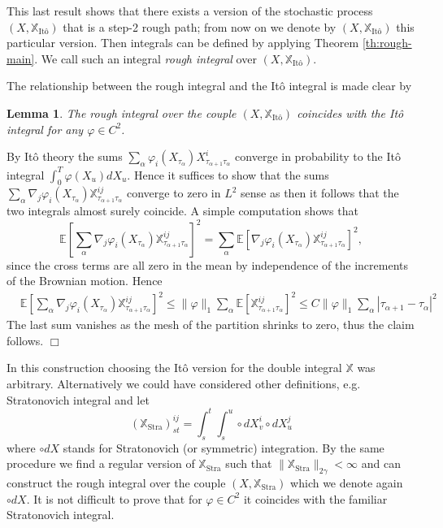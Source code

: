 \documentclass[a4paper,11pt]{article}
\newtheorem{lemma}[theorem]{Lemma}
\newenvironment{proof}[1][Proof]{{\sc #1.} }{\hfill $\Box$}
\newcommand{\expect}{\mathbb{E}}
\begin{document}
This last result shows that there exists a version of the stochastic process
$(X,\mathbb{X}_{\text{It\^o}})$ that is a step-2 rough path; from now on we 
denote by $(X,\mathbb{X}_{\text{It\^o}})$ this particular version. Then 
integrals can be defined by applying Theorem \ref{th:rough-main}. We
call such an integral \emph{rough integral} over $(X,\mathbb{X}_{\text{It\^o}})$.

The relationship between the rough integral and the It\^o integral is made
clear by 

\begin{lemma}
The rough integral over the couple $(X,\mathbb{X}_{\text{It\^o}})$
coincides with the It\^o integral for any $\varphi \in C^2$.  
\end{lemma}
\begin{proof}
By It\^o theory the sums
$
\sum_\alpha \varphi_i(X_{\tau_\alpha}) X^i_{\tau_{\alpha+1} \tau_\alpha}
$ 
converge in probability to the It\^o integral $\int_0^T \varphi(X_u) dX_u$.
Hence it suffices to show that the sums
$
\sum_\alpha \nabla_j \varphi_i(X_{\tau_\alpha}) \mathbb{X}_{\tau_{\alpha+1}
  \tau_\alpha}^{ij} 
$
converge to zero in $L^2$ sense as then it follows that the two
integrals almost surely coincide. A simple computation shows that
\begin{equation}
\expect\left[ \sum_\alpha \nabla_j \varphi_i(X_{\tau_\alpha}) 
\mathbb{X}_{\tau_{\alpha+1} \tau_\alpha}^{ij} \right]^2 
=  
\sum_\alpha \expect \left[  \nabla_j \varphi_i(X_{\tau_\alpha}) 
\mathbb{X}_{\tau_{\alpha+1} \tau_\alpha}^{ij} \right]^2,
\nonumber
\end{equation}
since the cross terms are all zero in the mean by independence of the
increments of the Brownian motion. Hence 
\begin{equation*}
  \begin{split}
& \expect\left[ \sum_\alpha \nabla_j \varphi_i(X_{\tau_\alpha}) 
  \mathbb{X}_{\tau_{\alpha+1} \tau_\alpha}^{ij} \right]^2
    \le \|\varphi\|_1 \sum_\alpha \expect \left[ \mathbb{X}_{\tau_{\alpha+1}
  \tau_\alpha}^{ij} \right]^2
    \le C \|\varphi\|_1 \sum_\alpha |\tau_{\alpha+1}
 - \tau_\alpha|^{2}
  \end{split}
\end{equation*}
The last sum vanishes as the mesh of the partition shrinks to zero, thus
the claim follows.
\end{proof}

In this construction choosing the It\^o version for the double integral
$\mathbb{X}$ was arbitrary. Alternatively we could have considered other
definitions, e.g. Stratonovich integral and let
$$
(\mathbb{X}_{\text{Stra}})_{st}^{ij} = \int_s^t \int_s^u \circ dX^i_v
\circ dX^j_u
$$
where $\circ dX$ stands for Stratonovich (or symmetric) integration. By 
the same procedure we find a regular version of $\mathbb{X}_{\text{Stra}}$ 
such that $\|\mathbb{X}_{\text{Stra}}\|_{2\gamma} < \infty$ and can 
construct the rough integral over the couple $(X,\mathbb{X}_{\text{Stra}})$ 
which we denote again $\circ dX$. It is not difficult to prove that for
$\varphi \in C^2$ it coincides with the familiar Stratonovich integral.
\end{document}
